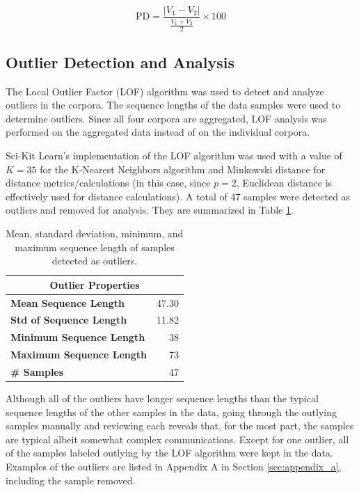 \documentclass[12pt]{article}
\begin{document}
\begin{equation}\label{eq:percent_difference}
    \mbox{PD} = \frac{|V_1 - V_2|}{\frac{V_1 + V_2}{2}} \times 100
\end{equation}

\subsection{Outlier Detection and Analysis}\label{sec:outliers}
The Local Outlier Factor (LOF) algorithm \cite{breunig_lof_2000} was used to detect and analyze outliers in the corpora. The sequence lengths of the
data samples were used to determine outliers. Since all four corpora are aggregated, LOF analysis was performed on the aggregated data instead of on
the individual corpora.

Sci-Kit Learn's \cite{pedregosa_scikit-learn_2011} implementation of the LOF algorithm was used with a value of \(K = 35\) for the K-Nearest Neighbors
algorithm and Minkowski distance for distance metrics/calculations (in this case, since \(p=2\), Euclidean distance is effectively used for distance
calculations). A total of 47 samples were detected as outliers and removed for analysis. They are summarized in Table \ref{tab:outlier_stats}.

\begin{table}[!t]
    \centering
    \begin{tabular}{l | r}
        \toprule
        \multicolumn{2}{c}{Outlier Properties}   \\
        \midrule
        \textbf{Mean Sequence Length}    & 47.30 \\
        \textbf{Std of Sequence Length}  & 11.82 \\
        \textbf{Minimum Sequence Length} & 38    \\
        \textbf{Maximum Sequence Length} & 73    \\
        \textbf{\# Samples}              & 47    \\
        \bottomrule
    \end{tabular}
    \caption{Mean, standard deviation, minimum, and maximum sequence length of samples detected as outliers.}
    \label{tab:outlier_stats}
\end{table}

Although all of the outliers have longer sequence lengths than the typical sequence lengths of the other samples in the data, going through the
outlying samples manually and reviewing each reveals that, for the most part, the samples are typical albeit somewhat complex communications. Except
for one outlier, all of the samples labeled outlying by the LOF algorithm were kept in the data. Examples of the outliers are listed in Appendix A in
Section \ref{sec:appendix_a}, including the sample removed.
\end{document}
